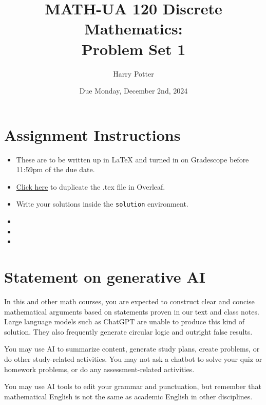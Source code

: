 \documentclass{article}
\title{MATH-UA 120 Discrete Mathematics: \\ Problem Set 1}
\author{%
    Harry Potter %
}
\date{Due Monday, December 2nd, 2024}
\theoremstyle{definition}
\begin{document}
\maketitle %


\section*{Assignment Instructions}

\begin{itemize}
    \item These are to be written up in \LaTeX{} and turned in on Gradescope before 11:59pm of the due date.
    \item \href{https://www.google.com}{Click here} to duplicate the .tex file in Overleaf.
    \item Write your solutions inside the \texttt{solution} environment.
    \item 
    \item 
    \item 
\end{itemize}

\vfill

\section*{Statement on generative AI}

In this and other math courses, you are expected to construct clear and concise mathematical arguments based on statements proven in our text and class notes. Large language models such as ChatGPT are unable to produce this kind of solution. They also frequently generate circular logic and outright false results.
 
You may use AI to summarize content, generate study plans, create problems, or do other study-related activities. You may not ask a chatbot to solve your quiz or homework problems, or do any assessment-related activities.
 
You may use AI tools to edit your grammar and punctuation, but remember that mathematical English is not the same as academic English in other disciplines. 

\vfill

\newpage

\end{document}
